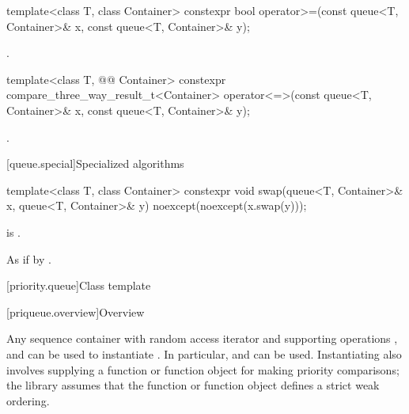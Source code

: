 %
\begin{itemdecl}
template<class T, class Container>
  constexpr bool operator>=(const queue<T, Container>& x, const queue<T, Container>& y);
\end{itemdecl}

\begin{itemdescr}
\pnum
\returns
{}.
\end{itemdescr}

%
\begin{itemdecl}
template<class T, @@ Container>
  constexpr compare_three_way_result_t<Container>
    operator<=>(const queue<T, Container>& x, const queue<T, Container>& y);
\end{itemdecl}

\begin{itemdescr}
\pnum
\returns
{}.
\end{itemdescr}

[queue.special]{Specialized algorithms}

%
\begin{itemdecl}
template<class T, class Container>
  constexpr void swap(queue<T, Container>& x, queue<T, Container>& y)
    noexcept(noexcept(x.swap(y)));
\end{itemdecl}

\begin{itemdescr}
\pnum
\constraints
{} is .

\pnum
\effects
As if by .
\end{itemdescr}

[priority.queue]{Class template }

[priqueue.overview]{Overview}

\pnum
{}%
Any sequence container with random access iterator and supporting operations
,
and
can be used to instantiate
.
In particular,
and
can be used.
Instantiating
also involves supplying a function or function object for making
priority comparisons; the library assumes that the function or function
object defines a strict weak ordering.

